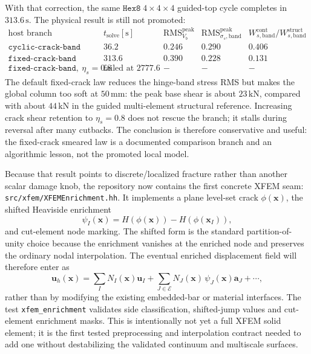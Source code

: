 With that correction, the same \(\texttt{Hex8}\;4\times4\times4\) guided-top
cycle completes in \(313.6\,\mathrm{s}\).  The physical result is still not
promoted:
\[
\begin{array}{l|r|r|r|r}
\text{host branch} & t_{\mathrm{solve}}[\mathrm{s}] &
\mathrm{RMS}_{V_b}^{\mathrm{peak}} &
\mathrm{RMS}_{\sigma_s,\mathrm{band}}^{\mathrm{peak}} &
W_{s,\mathrm{band}}^{\mathrm{cont}}/W_{s,\mathrm{band}}^{\mathrm{struct}}\\
\hline
\texttt{cyclic-crack-band} & 36.2 & 0.246 & 0.290 & 0.406\\
\texttt{fixed-crack-band} & 313.6 & 0.390 & 0.228 & 0.131\\
\texttt{fixed-crack-band},\ \eta_s=0.8 & \text{failed at }2777.6 & - & - & -
\end{array}
\]
The default fixed-crack law reduces the hinge-band stress RMS but makes the
global column too soft at \(50\,\mathrm{mm}\): the peak base shear is about
\(23\,\mathrm{kN}\), compared with about \(44\,\mathrm{kN}\) in the guided
multi-element structural reference.  Increasing crack shear retention to
\(\eta_s=0.8\) does not rescue the branch; it stalls during reversal after
many cutbacks.  The conclusion is therefore conservative and useful: the
fixed-crack smeared law is a documented comparison branch and an algorithmic
lesson, not the promoted local model.

Because that result points to discrete/localized fracture rather than another
scalar damage knob, the repository now contains the first concrete XFEM seam:
\texttt{src/xfem/XFEMEnrichment.hh}.  It implements a plane level-set crack
\(\phi(\mathbf{x})\), the shifted Heaviside enrichment
\[
  \psi_I(\mathbf{x}) =
  H(\phi(\mathbf{x})) - H(\phi(\mathbf{x}_I)),
\]
and cut-element node marking.  The shifted form is the standard partition-of-
unity choice because the enrichment vanishes at the enriched node and preserves
the ordinary nodal interpolation.  The eventual enriched displacement field
will therefore enter as
\[
  \mathbf{u}_h(\mathbf{x}) =
  \sum_I N_I(\mathbf{x})\mathbf{u}_I
  + \sum_{J\in\mathcal{E}} N_J(\mathbf{x})\,
    \psi_J(\mathbf{x})\mathbf{a}_J
  + \cdots ,
\]
rather than by modifying the existing embedded-bar or material interfaces.
The test \texttt{xfem\_enrichment} validates side classification, shifted-jump
values and cut-element enrichment masks.  This is intentionally not yet a full
XFEM solid element; it is the first tested preprocessing and interpolation
contract needed to add one without destabilizing the validated continuum and
multiscale surfaces.

